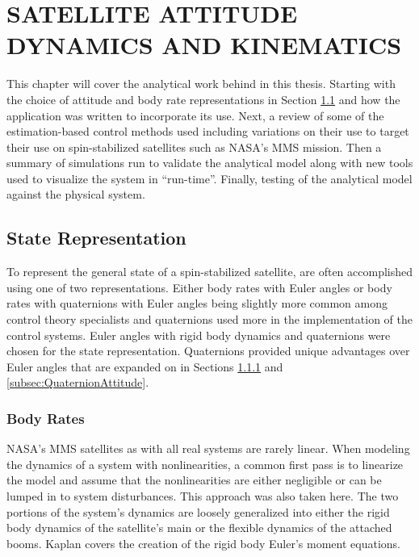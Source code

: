 
\chapter{SATELLITE ATTITUDE DYNAMICS AND KINEMATICS}
\label{chap:SatelliteAttitudeDynamicsAndKinematics}

This chapter will cover the analytical work behind in this thesis.  Starting with the choice of attitude and body rate representations in Section \ref{sec:StateRepresentation} and how the application was written to incorporate its use.  Next, a review of some of the estimation-based control methods used including variations on their use to target their use on spin-stabilized satellites such as NASA's MMS mission.  Then a summary of simulations run to validate the analytical model along with new tools used to visualize the system in ``run-time''.  Finally, testing of the analytical model against the physical system.

\section{State Representation}
\label{sec:StateRepresentation}

To represent the general state of a spin-stabilized satellite, are often accomplished using one of two representations.  Either body rates with Euler angles or body rates with quaternions with Euler angles being slightly more common among control theory specialists and quaternions used more in the implementation of the control systems.  Euler angles with rigid body dynamics and quaternions were chosen for the state representation.  Quaternions provided unique advantages over Euler angles that are expanded on in Sections \ref{subsec:BodyRate} and \ref{subsec:QuaternionAttitude}.

\subsection{Body Rates}
\label{subsec:BodyRate}

NASA's MMS satellites as with all real systems are rarely linear.  When modeling the dynamics of a system with nonlinearities, a common first pass is to linearize the model and assume that the nonlinearities are either negligible or can be lumped in to system disturbances.  This approach was also taken here.  The two portions of the system's dynamics are loosely generalized into either the rigid body dynamics of the satellite's main or the flexible dynamics of the attached booms.  Kaplan \cite{kaplan} covers the creation of the rigid body Euler's moment equations.

